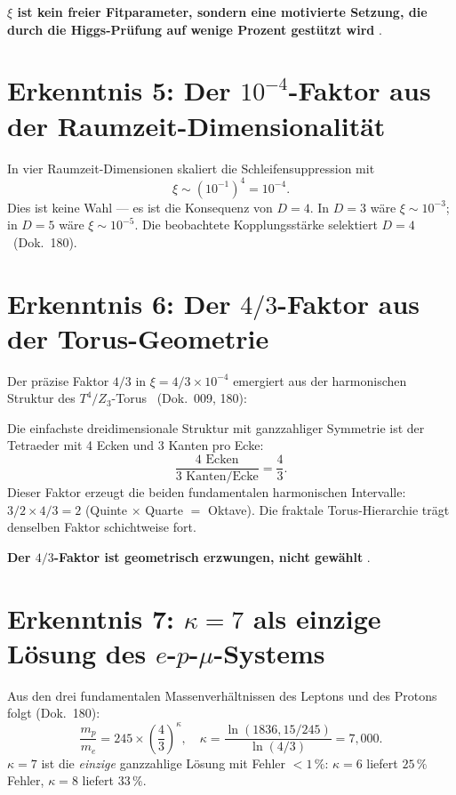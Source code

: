 \textbf{$\xi$ ist kein freier Fitparameter, sondern eine motivierte Setzung,
die durch die Higgs-Prüfung auf wenige Prozent gestützt wird} \SM.

\section{Erkenntnis 5: Der $10^{-4}$-Faktor aus der Raumzeit-Dimensionalität}

In vier Raumzeit-Dimensionen skaliert die Schleifensuppression mit
\begin{equation}
  \xi \sim (10^{-1})^4 = 10^{-4}.
  \label{eq:4d_factor}
\end{equation}
Dies ist keine Wahl --- es ist die Konsequenz von $D = 4$. In $D = 3$
wäre $\xi \sim 10^{-3}$; in $D = 5$ wäre $\xi \sim 10^{-5}$.
Die beobachtete Kopplungsstärke selektiert $D = 4$ \BM\ (Dok.~180).

\section{Erkenntnis 6: Der $4/3$-Faktor aus der Torus-Geometrie}

Der präzise Faktor $4/3$ in $\xi = 4/3 \times 10^{-4}$ emergiert aus der
harmonischen Struktur des $T^4/Z_3$-Torus \BM\ (Dok.~009, 180):

Die einfachste dreidimensionale Struktur mit ganzzahliger Symmetrie ist der
Tetraeder mit 4 Ecken und 3 Kanten pro Ecke:
\begin{equation}
  \frac{4\text{ Ecken}}{3\text{ Kanten/Ecke}} = \frac{4}{3}.
  \label{eq:tetrahedron}
\end{equation}
Dieser Faktor erzeugt die beiden fundamentalen harmonischen Intervalle:
$3/2 \times 4/3 = 2$ (Quinte $\times$ Quarte $=$ Oktave). Die fraktale
Torus-Hierarchie trägt denselben Faktor schichtweise fort.

\textbf{Der $4/3$-Faktor ist geometrisch erzwungen, nicht gewählt} \BM.

\section{Erkenntnis 7: $\kappa = 7$ als einzige Lösung des $e$-$p$-$\mu$-Systems}

Aus den drei fundamentalen Massenverhältnissen des Leptons und des Protons
folgt (Dok.~180):
\begin{equation}
  \frac{m_p}{m_e} = 245\times\left(\frac{4}{3}\right)^\kappa,
  \quad
  \kappa = \frac{\ln(1836{,}15/245)}{\ln(4/3)} = 7{,}000.
  \label{eq:kappa7}
\end{equation}
$\kappa = 7$ ist die \emph{einzige} ganzzahlige Lösung mit Fehler $<1\,\%$:
$\kappa = 6$ liefert $25\,\%$ Fehler, $\kappa = 8$ liefert $33\,\%$.

